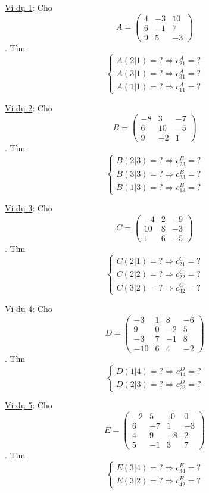 \documentclass[
]{article}
\let\ul\uline
\begin{document}
\ul{Ví dụ 1}: Cho
$$A = \begin{pmatrix} 4 & -3 & 10 \\ 6 & -1 & 7 \\ 9 & 5 & -3 \end{pmatrix}$$. Tìm
$$\begin{cases} A(2|1) =? \Rightarrow c_{21}^A =? \\ A(3|1) =? \Rightarrow c_{31}^A =? \\ A(1|1) =? \Rightarrow c_{11}^A =? \end{cases}$$

\ul{Ví dụ 2}: Cho
$$B = \begin{pmatrix} -8 & 3 & -7 \\ 6 & 10 & -5 \\ 9 & -2 & 1 \end{pmatrix}$$. Tìm
$$\begin{cases} B(2|3) =? \Rightarrow c_{23}^B =? \\ B(3|3) =? \Rightarrow c_{33}^B =? \\ B(1|3) =? \Rightarrow c_{13}^B =? \end{cases}$$

\ul{Ví dụ 3}: Cho
$$C = \begin{pmatrix} -4 & 2 & -9 \\ 10 & 8 & -3 \\ 1 & 6 & -5 \end{pmatrix}$$. Tìm
$$\begin{cases} C(2|1) =? \Rightarrow c_{21}^C =? \\ C(2|2) =? \Rightarrow c_{22}^C =? \\ C(3|2) =? \Rightarrow c_{32}^C =? \end{cases}$$

\ul{Ví dụ 4}: Cho
$$D = \begin{pmatrix} -3 & 1 & 8 & -6 \\ 9 & 0 & -2 & 5 \\ -3 & 7 & -1 & 8 \\ -10 & 6 & 4 & -2 \end{pmatrix}$$. Tìm
$$\begin{cases} D(1|4) =? \Rightarrow c_{14}^D =? \\ D(2|3) =? \Rightarrow c_{23}^D =? \end{cases}$$

\ul{Ví dụ 5}: Cho
$$E = \begin{pmatrix} -2 & 5 & 10 & 0 \\ 6 & -7 & 1 & -3 \\ 4 & 9 & -8 & 2 \\ 5 & -1 & 3 & 7 \end{pmatrix}$$. Tìm
$$\begin{cases} E(3|4) =? \Rightarrow c_{34}^E =? \\ E(3|2) =? \Rightarrow c_{42}^E =? \end{cases}$$
\end{document}
